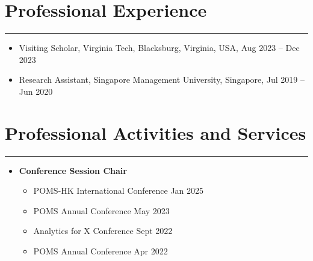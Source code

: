 \documentclass[12pt, a4paper]{article}
\begin{document}
{%


\section*{Professional Experience}
\vspace*{4pt}
\hrule

\begin{itemize}[leftmargin=30pt, itemsep=0pt]
    \item Visiting Scholar, Virginia Tech, Blacksburg, Virginia, USA, Aug 2023 -- Dec 2023	
    \item Research Assistant, Singapore Management University, Singapore, Jul 2019 -- Jun 2020
\end{itemize}




\section*{Professional Activities and Services}
\vspace*{4pt}
\hrule

\begin{itemize}[leftmargin=16pt]
	\item[] \textbf{Conference Session Chair}
	\begin{itemize}[parsep=2pt, label=$\bullet$]
		\item POMS-HK International Conference \hfill Jan 2025
		\item POMS Annual Conference \hfill May 2023
		\item Analytics for X Conference \hfill Sept 2022
		\item POMS Annual Conference \hfill Apr 2022
	\end{itemize}


\end{itemize}}
\end{document}
